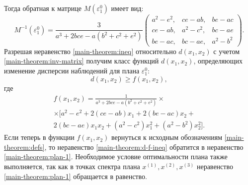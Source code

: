 Тогда обратная к матрице $M(\varepsilon_1^0)$ имеет вид:
\begin{equation} \label{main-theorem:inv-matrix}
M^{-1}(\varepsilon_1^0) = \frac 3 {a^3 + 2 b c e - a(b^2 + c^2 + e^2)}
\begin{pmatrix}
a^2 - e^2,& ce - ab, & be - ac\\
ce - ab,& a^2-c^2,& bc-ae\\
be - ac,& bc - ae,& a^2 - b^2			
\end{pmatrix}.
\end{equation}
Разрешая неравенство \eqref{main-theorem:ineq} относительно $d(x_1, x_2)$ с учетом \eqref{main-theorem:inv-matrix} получим класс функций $d(x_1, x_2)$, определяющих изменение
дисперсии наблюдений для плана $\varepsilon_1^0$:
\begin{equation} \label{main-theorem:d-f-ineq}
d(x_1, x_2) \ge f(x_1, x_2),
\end{equation}
где
\begin{multline}
f(x_1, x_2) =
\frac {1}{a^3 + 2bce - a(b^2+c^2+e^2)} \times \\
\times [ {a^2 - e^2 +2(ce - ab)x_1 + 2(be-ac)x_2} + \\ { 2(bc - ae)x_1 x_2 + (a^2 - c^2)x_1^2 + (a^2 - b^2)x_2^2 }].		
\end{multline}
Если теперь в функции $f(x_1, x_2)$ вернуться к исходным обозначениям \eqref{main-theorem:defs}, то неравенство \eqref{main-theorem:d-f-ineq} обратится в неравенство \eqref{main-theorem:plan-1}. Необходимое условие оптимальности плана также выполняется, так как в точках спектра плана $x^{(1)}, x^{(2)}, x^{(3)}$  неравенство \eqref{main-theorem:plan-1} обращается в равенство.

